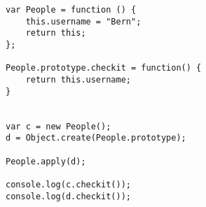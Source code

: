\begin{verbatim}
var People = function () {
    this.username = "Bern";
	return this;
};

People.prototype.checkit = function() {
	return this.username;
}


var c = new People();
d = Object.create(People.prototype);

People.apply(d);

console.log(c.checkit());
console.log(d.checkit());
\end{verbatim}